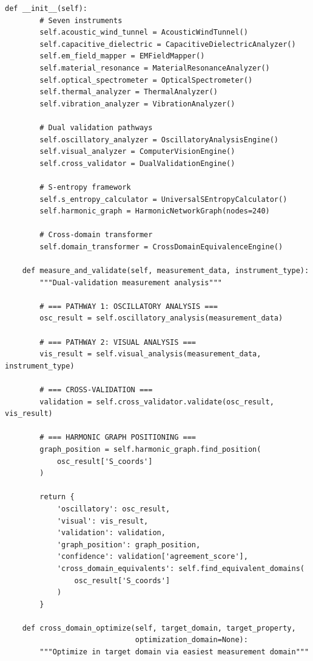 \documentclass[12pt,a4paper]{article}
\begin{document}
{{{{{{{{{{{{{{{{\begin{lstlisting}[style=pythonstyle, caption=Grand Unified Laboratory Compiler Core]
    def __init__(self):
        # Seven instruments
        self.acoustic_wind_tunnel = AcousticWindTunnel()
        self.capacitive_dielectric = CapacitiveDielectricAnalyzer()
        self.em_field_mapper = EMFieldMapper()
        self.material_resonance = MaterialResonanceAnalyzer()
        self.optical_spectrometer = OpticalSpectrometer()
        self.thermal_analyzer = ThermalAnalyzer()
        self.vibration_analyzer = VibrationAnalyzer()
        
        # Dual validation pathways
        self.oscillatory_analyzer = OscillatoryAnalysisEngine()
        self.visual_analyzer = ComputerVisionEngine()
        self.cross_validator = DualValidationEngine()
        
        # S-entropy framework
        self.s_entropy_calculator = UniversalSEntropyCalculator()
        self.harmonic_graph = HarmonicNetworkGraph(nodes=240)
        
        # Cross-domain transformer
        self.domain_transformer = CrossDomainEquivalenceEngine()
    
    def measure_and_validate(self, measurement_data, instrument_type):
        """Dual-validation measurement analysis"""
        
        # === PATHWAY 1: OSCILLATORY ANALYSIS ===
        osc_result = self.oscillatory_analysis(measurement_data)
        
        # === PATHWAY 2: VISUAL ANALYSIS ===
        vis_result = self.visual_analysis(measurement_data, instrument_type)
        
        # === CROSS-VALIDATION ===
        validation = self.cross_validator.validate(osc_result, vis_result)
        
        # === HARMONIC GRAPH POSITIONING ===
        graph_position = self.harmonic_graph.find_position(
            osc_result['S_coords']
        )
        
        return {
            'oscillatory': osc_result,
            'visual': vis_result,
            'validation': validation,
            'graph_position': graph_position,
            'confidence': validation['agreement_score'],
            'cross_domain_equivalents': self.find_equivalent_domains(
                osc_result['S_coords']
            )
        }
    
    def cross_domain_optimize(self, target_domain, target_property, 
                              optimization_domain=None):
        """Optimize in target domain via easiest measurement domain"""
        

\end{lstlisting}}}}}}}}}}}}}}}}}
\end{document}
